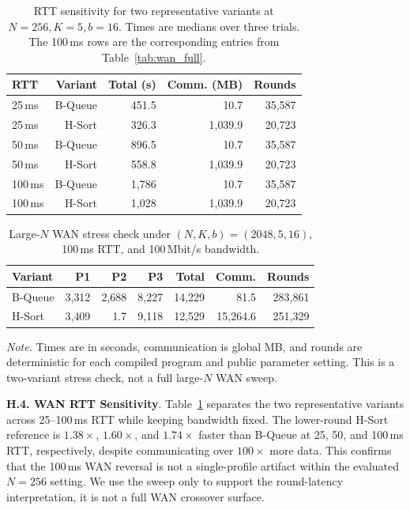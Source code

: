 \documentclass[conference,compsoc,letterpaper]{IEEEtran}
\theoremstyle{definition}
\theoremstyle{remark}
\newcommand{\myparagraph}[1]{\noindent \textbf{#1}.}
\newcommand{\HSort}{H-Sort}
\newcommand{\BQueue}{B-Queue}
\begin{document}
\begin{table}[!ht]
\centering
\small
\setlength{\tabcolsep}{4pt}
\caption{RTT sensitivity for two representative variants at
$N=256,K=5,b=16$. Times are medians over three trials. The 100\,ms rows are the corresponding entries from Table~\ref{tab:wan_full}.}
\label{tab:wan_rtt_sweep}
\begin{tabular}{@{}lrrrr@{}}
\toprule
\textbf{RTT} & \textbf{Variant} & \textbf{Total (s)} & \textbf{Comm. (MB)} & \textbf{Rounds} \\
\midrule
25\,ms  & \BQueue{} & 451.5  & 10.7      & 35{,}587 \\
25\,ms  & \HSort{}  & 326.3  & 1{,}039.9 & 20{,}723 \\
50\,ms  & \BQueue{} & 896.5  & 10.7      & 35{,}587 \\
50\,ms  & \HSort{}  & 558.8  & 1{,}039.9 & 20{,}723 \\
100\,ms & \BQueue{} & 1{,}786 & 10.7      & 35{,}587 \\
100\,ms & \HSort{}  & 1{,}028 & 1{,}039.9 & 20{,}723 \\
\bottomrule
\end{tabular}
\end{table}
\begin{table}[!ht]
\centering
\footnotesize
\setlength{\tabcolsep}{3pt}
\caption{Large-\(N\) WAN stress check under
\((N,K,b)=(2048,5,16)\), 100\,ms RTT, and 100\,Mbit/s bandwidth.}
\label{tab:wan_n2048_stress}
\begin{tabular}{@{}lrrrrrr@{}}
\toprule
\textbf{Variant}
& \textbf{P1}
& \textbf{P2}
& \textbf{P3}
& \textbf{Total}
& \textbf{Comm.}
& \textbf{Rounds} \\
\midrule
\BQueue{} & 3{,}312 & 2{,}688 & 8{,}227 & 14{,}229 & 81.5   & 283{,}861 \\
\HSort{}  & 3{,}409 & 1.7     & 9{,}118 & 12{,}529 & 15{,}264.6 & 251{,}329 \\
\bottomrule
\end{tabular}

\vspace{2pt}
\footnotesize
\parbox{\linewidth}{
\emph{Note.} Times are in seconds, communication is global MB, and
rounds are deterministic for each compiled program and public parameter
setting. This is a two-variant stress check, not a full large-\(N\) WAN
sweep.}

\end{table}
\myparagraph{H.4. WAN RTT Sensitivity}
\label{app:wan_rtt}
Table~\ref{tab:wan_rtt_sweep} separates the two representative variants across 25--100\,ms RTT while keeping bandwidth fixed.
The lower-round \HSort{} reference is \(1.38\times\), \(1.60\times\), and \(1.74\times\) faster than \BQueue{} at 25, 50, and
100\,ms RTT, respectively, despite communicating over \(100\times\) more data.
This confirms that the 100\,ms WAN reversal is not a single-profile artifact within the evaluated \(N=256\) setting.
We use the sweep only to support the round-latency interpretation, it is not a full WAN crossover surface.
\end{document}
